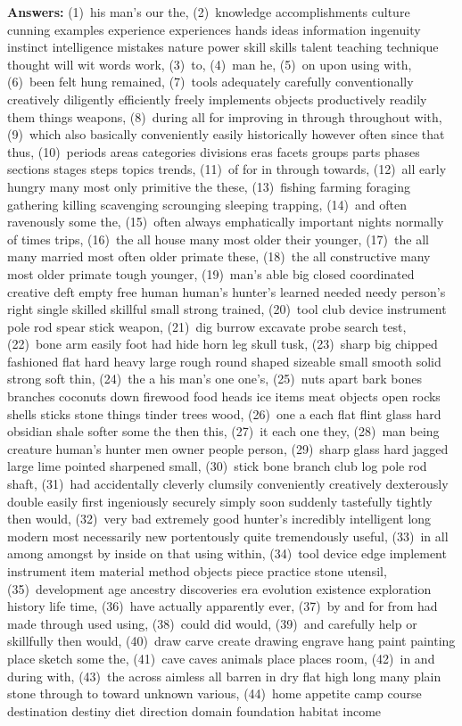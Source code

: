 \vspace{0.5 cm}

\textbf{Answers:} (1)~his man's our the, (2)~knowledge accomplishments culture cunning examples experience experiences hands ideas information ingenuity instinct intelligence mistakes nature power skill skills talent teaching technique thought will wit words work, (3)~to, (4)~man he, (5)~on upon using with, (6)~been felt hung remained, (7)~tools adequately carefully conventionally creatively diligently efficiently freely implements objects productively readily them things weapons, (8)~during all for improving in through throughout with, (9)~which also basically conveniently easily historically however often since that thus, (10)~periods areas categories divisions eras facets groups parts phases sections stages steps topics trends, (11)~of for in through towards, (12)~all early hungry many most only primitive the these, (13)~fishing farming foraging gathering killing scavenging scrounging sleeping trapping, (14)~and often ravenously some the, (15)~often always emphatically important nights normally of times trips, (16)~the all house many most older their younger, (17)~the all many married most often older primate these, (18)~the all constructive many most older primate tough younger, (19)~man's able big closed coordinated creative deft empty free human human's hunter's learned needed needy person's right single skilled skillful small strong trained, (20)~tool club device instrument pole rod spear stick weapon, (21)~dig burrow excavate probe search test, (22)~bone arm easily foot had hide horn leg skull tusk, (23)~sharp big chipped fashioned flat hard heavy large rough round shaped sizeable small smooth solid strong soft thin, (24)~the a his man's one one's, (25)~nuts apart bark bones branches coconuts down firewood food heads ice items meat objects open rocks shells sticks stone things tinder trees wood, (26)~one a each flat flint glass hard obsidian shale softer some the then this, (27)~it each one they, (28)~man being creature human's hunter men owner people person, (29)~sharp glass hard jagged large lime pointed sharpened small, (30)~stick bone branch club log pole rod shaft, (31)~had accidentally cleverly clumsily conveniently creatively dexterously double easily first ingeniously securely simply soon suddenly tastefully tightly then would, (32)~very bad extremely good hunter's incredibly intelligent long modern most necessarily new portentously quite tremendously useful, (33)~in all among amongst by inside on that using within, (34)~tool device edge implement instrument item material method objects piece practice stone utensil, (35)~development age ancestry discoveries era evolution existence exploration history life time, (36)~have actually apparently ever, (37)~by and for from had made through used using, (38)~could did would, (39)~and carefully help or skillfully then would, (40)~draw carve create drawing engrave hang paint painting place sketch some the, (41)~cave caves animals place places room, (42)~in and during with, (43)~the across aimless all barren in dry flat high long many plain stone through to toward unknown various, (44)~home appetite camp course destination destiny diet direction domain foundation habitat income 